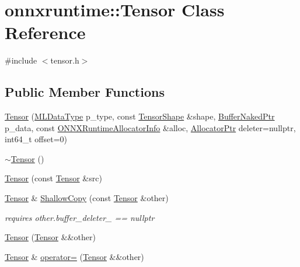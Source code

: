 \hypertarget{classonnxruntime_1_1Tensor}{}\section{onnxruntime\+:\+:Tensor Class Reference}
\label{classonnxruntime_1_1Tensor}


{\ttfamily \#include $<$tensor.\+h$>$}

\subsection*{Public Member Functions}
\begin{DoxyCompactItemize}
\item 
\mbox{\hyperlink{classonnxruntime_1_1Tensor_aa4a6341d3df270e20756ad36b2e4dd32}{Tensor}} (\mbox{\hyperlink{namespaceonnxruntime_ad77d0a6e838ec7da5dc35fed5ee66b49}{M\+L\+Data\+Type}} p\+\_\+type, const \mbox{\hyperlink{classonnxruntime_1_1TensorShape}{Tensor\+Shape}} \&shape, \mbox{\hyperlink{namespaceonnxruntime_a1077ff17fe9e6d571cea3082b9e3a22b}{Buffer\+Naked\+Ptr}} p\+\_\+data, const \mbox{\hyperlink{structONNXRuntimeAllocatorInfo}{O\+N\+N\+X\+Runtime\+Allocator\+Info}} \&alloc, \mbox{\hyperlink{namespaceonnxruntime_a6cdac724c5dcefded3a63f08dae58fda}{Allocator\+Ptr}} deleter=nullptr, int64\+\_\+t offset=0)
\item 
\mbox{\hyperlink{classonnxruntime_1_1Tensor_af1c76fd7465e7d8297c8a285dd4e9cc2}{$\sim$\+Tensor}} ()
\item 
\mbox{\hyperlink{classonnxruntime_1_1Tensor_ad812cddaf6bb36cbe9259940acc26567}{Tensor}} (const \mbox{\hyperlink{classonnxruntime_1_1Tensor}{Tensor}} \&src)
\item 
\mbox{\hyperlink{classonnxruntime_1_1Tensor}{Tensor}} \& \mbox{\hyperlink{classonnxruntime_1_1Tensor_afcd8a954ac21fb11ceb3652883493511}{Shallow\+Copy}} (const \mbox{\hyperlink{classonnxruntime_1_1Tensor}{Tensor}} \&other)
\begin{DoxyCompactList}\small\item\em requires other.\+buffer\+\_\+deleter\+\_\+ == nullptr \end{DoxyCompactList}\item 
\mbox{\hyperlink{classonnxruntime_1_1Tensor_a7ba43380aa69742136752e11b38c927a}{Tensor}} (\mbox{\hyperlink{classonnxruntime_1_1Tensor}{Tensor}} \&\&other)
\item 
\mbox{\hyperlink{classonnxruntime_1_1Tensor}{Tensor}} \& \mbox{\hyperlink{classonnxruntime_1_1Tensor_a2492423abd572294c6b1df2faaa2fd7b}{operator=}} (\mbox{\hyperlink{classonnxruntime_1_1Tensor}{Tensor}} \&\&other)

\end{DoxyCompactItemize}

